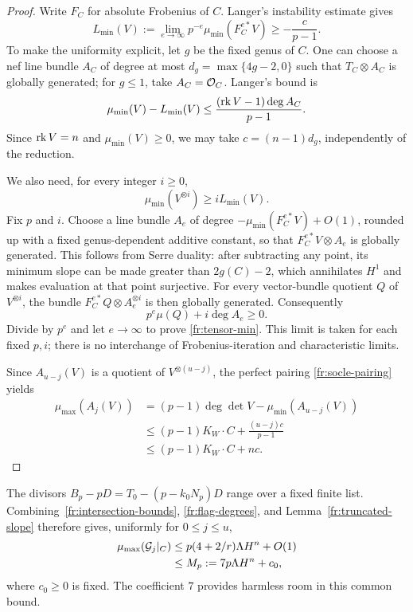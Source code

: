 \begin{proof}
Write $F_C$ for absolute Frobenius of $C$.  Langer's instability
estimate \cite[Corollary~2.5]{Langer} gives
\begin{equation}\label{fr:Langer-min}
 L_{\min}(V):=
 \lim_{e\to\infty}p^{-e}\mu_{\min}(F_C^{e*}V)
 \ge-\frac{c}{p-1}.
\end{equation}
To make the uniformity explicit, let $g$ be the fixed genus of $C$.
One can choose a nef line bundle $A_C$ of degree at most
$d_g=\max\{4g-2,0\}$ such that $T_C\otimes A_C$ is globally
generated; for $g\le1$, take $A_C=\mathcal O_C$. Langer's bound is
\[
 \mu_{\min}(V)-L_{\min}(V)
 \le\frac{(\operatorname{rk} V-1)\deg A_C}{p-1}.
\]
Since $\operatorname{rk} V=n$ and $\mu_{\min}(V)\ge0$, we may take
$c=(n-1)d_g$, independently of the reduction.

We also need, for every integer $i\ge0$,
\begin{equation}\label{fr:tensor-min}
 \mu_{\min}(V^{\otimes i})\ge iL_{\min}(V).
\end{equation}
Fix $p$ and $i$.  Choose a line bundle $A_e$ of degree
$-\mu_{\min}(F_C^{e*}V)+O(1)$, rounded up with a fixed
genus-dependent additive constant, so that
$F_C^{e*}V\otimes A_e$ is globally generated.  This follows from
Serre duality: after subtracting any point, its minimum slope can
be made greater than $2g(C)-2$, which annihilates $H^1$ and makes
evaluation at that point surjective.  For every vector-bundle
quotient $Q$ of $V^{\otimes i}$, the bundle
$F_C^{e*}Q\otimes A_e^{\otimes i}$ is then globally generated.
Consequently
\[
 p^e\mu(Q)+i\deg A_e\ge0.
\]
Divide by $p^e$ and let $e\to\infty$ to prove
\eqref{fr:tensor-min}.  This limit is taken for each fixed $p,i$;
there is no interchange of Frobenius-iteration and characteristic
limits.

Since $A_{u-j}(V)$ is a quotient of $V^{\otimes(u-j)}$, the perfect
pairing \eqref{fr:socle-pairing} yields
\begin{align*}
 \mu_{\max}(A_j(V))
 &= (p-1)\deg\det V-\mu_{\min}(A_{u-j}(V))\\
 &\le(p-1)K_W\cdot C+\frac{(u-j)c}{p-1}\\
 &\le(p-1)K_W\cdot C+nc.
\end{align*}
\end{proof}

The divisors $B_p-pD=T_0-(p-k_0N_p)D$ range over a fixed finite
list. Combining~\eqref{fr:intersection-bounds},
\eqref{fr:flag-degrees}, and Lemma~\ref{fr:truncated-slope}
therefore gives, uniformly for $0\le j\le u$,
\begin{align}
 \mu_{\max}(\mathcal G_j|_C)
 &\le p(4+2/r)\Lambda H^n+O(1)\notag\\
 &\le M_p:=7p\Lambda H^n+c_0,\label{fr:common-slope-bound}
\end{align}
where $c_0\ge0$ is fixed.  The coefficient $7$ provides harmless
room in this common bound.

